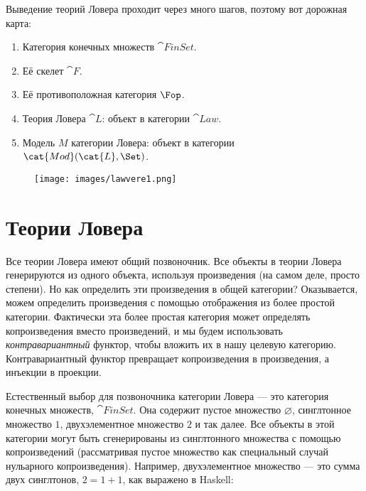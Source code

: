 Выведение теорий Ловера проходит через много шагов, поэтому вот
дорожная карта:

\begin{enumerate}
  \tightlist
  \item
        Категория конечных множеств $\cat{FinSet}$.
  \item
        Её скелет $\cat{F}$.
  \item
        Её противоположная категория $\Fop$.
  \item
        Теория Ловера $\cat{L}$: объект в категории $\cat{Law}$.
  \item
        Модель $M$ категории Ловера: объект в категории\\
        $\cat{Mod}(\cat{L}, \Set)$.
\end{enumerate}

\begin{figure}[H]
  \centering
  \texttt{[image: images/lawvere1.png]}
\end{figure}

\section{Теории Ловера}

Все теории Ловера имеют общий позвоночник. Все объекты в теории
Ловера генерируются из одного объекта, используя произведения (на самом деле, просто
степени). Но как определить эти произведения в общей категории?
Оказывается, можем определить произведения с помощью отображения из более простой
категории. Фактически эта более простая категория может определять копроизведения вместо
произведений, и мы будем использовать \emph{контравариантный} функтор, чтобы вложить их в
нашу целевую категорию. Контравариантный функтор превращает копроизведения в
произведения, а инъекции в проекции.

Естественный выбор для позвоночника категории Ловера — это
категория конечных множеств, $\cat{FinSet}$. Она содержит пустое множество
$\varnothing$, синглтонное множество $1$, двухэлементное множество $2$
и так далее. Все объекты в этой категории могут быть сгенерированы из
синглтонного множества с помощью копроизведений (рассматривая пустое множество как специальный случай
нульарного копроизведения). Например, двухэлементное множество — это сумма двух
синглтонов, $2 = 1 + 1$, как выражено в Haskell:

